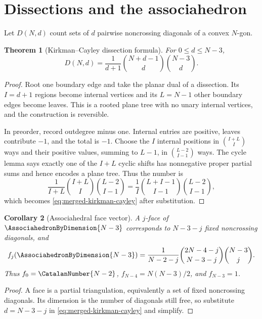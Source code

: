\documentclass[11pt,a4paper,oneside,openany]{book}
\newtheorem{theorem}{Theorem}[chapter]
\newtheorem{corollary}[theorem]{Corollary}
\theoremstyle{definition}
\theoremstyle{remark}
\begin{document}
\section{Dissections and the associahedron}

Let $D(N,d)$ count sets of $d$ pairwise noncrossing diagonals of a convex
$N$-gon.

\begin{theorem}[Kirkman--Cayley dissection formula]
\label{thm:merged-kirkman-cayley}
For $0\leq d\leq N-3$,
\begin{equation}
 D(N,d)=\frac1{d+1}\binom{N+d-1}{d}\binom{N-3}{d}.                 \label{eq:merged-kirkman-cayley}
\end{equation}
\end{theorem}

\begin{proof}
Root one boundary edge and take the planar dual of a dissection.  Its
$I=d+1$ regions become internal vertices and its $L=N-1$ other boundary edges
become leaves.  This is a rooted plane tree with no unary internal vertices,
and the construction is reversible.

In preorder, record outdegree minus one.  Internal entries are positive,
leaves contribute $-1$, and the total is $-1$.  Choose the $I$ internal
positions in $\binom{I+L}{I}$ ways and their positive values, summing to
$L-1$, in $\binom{L-2}{I-1}$ ways.  The cycle lemma says exactly one of the
$I+L$ cyclic shifts has nonnegative proper partial sums and hence encodes a
plane tree.  Thus the number is
\[
 \frac1{I+L}\binom{I+L}{I}\binom{L-2}{I-1}
 =\frac1I\binom{L+I-1}{I-1}\binom{L-2}{I-1},
\]
which becomes \eqref{eq:merged-kirkman-cayley} after substitution.
\end{proof}

\begin{corollary}[Associahedral face vector]
\label{cor:merged-associahedron-f}
A $j$-face of $\AssociahedronByDimension{N-3}$ corresponds to $N-3-j$ fixed noncrossing
diagonals, and
\begin{equation}
 f_j(\AssociahedronByDimension{N-3})=\frac1{N-2-j}
 \binom{2N-4-j}{N-3-j}\binom{N-3}{j}.                              \label{eq:merged-associahedron-f}
\end{equation}
Thus $f_0=\CatalanNumber{N-2}$, $f_{N-4}=N(N-3)/2$, and $f_{N-3}=1$.
\end{corollary}

\begin{proof}
A face is a partial triangulation, equivalently a set of fixed noncrossing
diagonals.  Its dimension is the number of diagonals still free, so substitute
$d=N-3-j$ in \eqref{eq:merged-kirkman-cayley} and simplify.
\end{proof}
\end{document}

